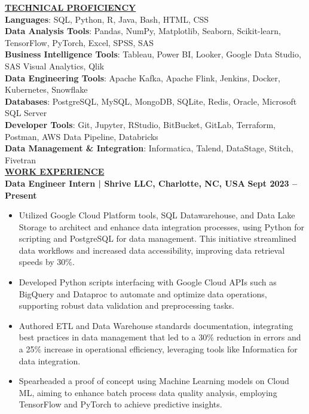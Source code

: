 \documentclass{article}
\begin{document}
\noindent \textbf{\underline{TECHNICAL PROFICIENCY}} \\
\textbf{Languages}{: \small SQL, Python, R, Java, Bash, HTML, CSS} \\
\textbf{Data Analysis Tools}{: \small Pandas, NumPy, Matplotlib, Seaborn, Scikit-learn, TensorFlow, PyTorch, Excel, SPSS, SAS} \\
\textbf{Business Intelligence Tools}{: \small Tableau, Power BI, Looker, Google Data Studio, SAS Visual Analytics, Qlik} \\
\textbf{Data Engineering Tools}{: \small Apache Kafka, Apache Flink, Jenkins, Docker, Kubernetes, Snowflake} \\
\textbf{Databases}{: \small PostgreSQL, MySQL, MongoDB, SQLite, Redis, Oracle, Microsoft SQL Server} \\
\textbf{Developer Tools}{: \small Git, Jupyter, RStudio, BitBucket, GitLab, Terraform, Postman, AWS Data Pipeline, Databricks} \\
\textbf{Data Management \& Integration}{: \small Informatica, Talend, DataStage, Stitch, Fivetran} \\


\noindent \textbf{\underline{WORK EXPERIENCE}}\\
\noindent \textbf{Data Engineer Intern | Shrive LLC, Charlotte, NC, USA} \hfill \textbf{Sept 2023 – Present}
\begin{itemize}[noitemsep,nolistsep,leftmargin=*]
\item {\small Utilized Google Cloud Platform tools, SQL Datawarehouse, and Data Lake Storage to architect and enhance data integration processes, using Python for scripting and PostgreSQL for data management. This initiative streamlined data workflows and increased data accessibility, improving data retrieval speeds by 30\%.}
\item {\small Developed Python scripts interfacing with Google Cloud APIs such as BigQuery and Dataproc to automate and optimize data operations, supporting robust data validation and preprocessing tasks.}
\item {\small Authored ETL and Data Warehouse standards documentation, integrating best practices in data management that led to a 30\% reduction in errors and a 25\% increase in operational efficiency, leveraging tools like Informatica for data integration.}
\item {\small Spearheaded a proof of concept using Machine Learning models on Cloud ML, aiming to enhance batch process data quality analysis, employing TensorFlow and PyTorch to achieve predictive insights.}\\
\end{itemize}
\end{document}
